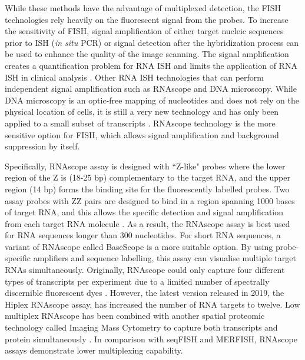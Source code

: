 While these methods have the advantage of multiplexed detection, the FISH technologies rely heavily on the fluorescent signal from the probes. To increase the sensitivity of FISH, signal amplification of either target nucleic sequences prior to ISH (\ie \textit{in situ} PCR) or signal detection after the hybridization process \cite{qian2003recent} can be used to enhance the quality of the image scanning. The signal amplification creates a quantification problem for RNA ISH and limits the application of RNA ISH in clinical analysis \cite{levsky2003fluorescence,wang2012rnascope}. Other RNA ISH technologies that can perform independent signal amplification such as RNAscope and DNA microscopy. While DNA microscopy is an optic-free mapping of nucleotides and does not rely on the physical location of cells, it is still a very new technology and has only been applied to a small subset of transcripts \cite{asp2020spatially,weinstein2019dna}. RNAscope technology is the more sensitive option for FISH, which allows signal amplification and background suppression by itself.

Specifically, RNAscope assay is designed with ``Z-like" probes where the lower region of the Z is (18-25 bp) complementary to the target RNA, and the upper region (14 bp) forms the binding site for the fluorescently labelled probes. Two assay probes with ZZ pairs are designed to bind in a region spanning 1000 bases of target RNA, and this allows the specific detection and signal amplification from each target RNA molecule \cite{solanki2020visualization}. As a result, the RNAscope assay is best used for RNA sequences longer than 300 nucleotides. For short RNA sequences, a variant of RNAscope called BaseScope is a more suitable option. By using probe-specific amplifiers and sequence labelling, this assay can visualise multiple target RNAs simultaneously. Originally, RNAscope could only capture four different types of transcripts per experiment due to a limited number of spectrally discernible fluorescent dyes \cite{wang2012rnascope}. However, the latest version released in 2019, the Hiplex RNAscope assay, has increased the number of RNA targets to twelve. Low multiplex RNAscope has been combined with another spatial proteomic technology called Imaging Mass Cytometry to capture both transcripts and protein simultaneously \cite{schulz2018simultaneous}. In comparison with seqFISH and MERFISH, RNAscope assays demonstrate lower multiplexing capability. 

